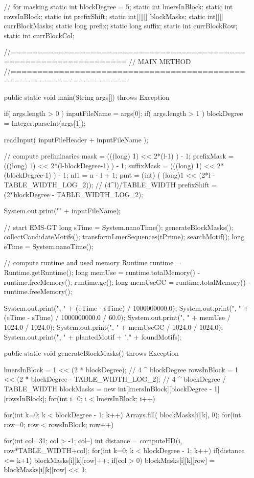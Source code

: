\documentclass[oneside,12pt]{DISCSthesis}
\begin{document}
{\begin{footnotesize}
\begin{verbatimtab}[2]
{	// for masking
	static int blockDegree = 5;
	static int lmersInBlock;
	static int rowsInBlock;
	static int prefixShift;
	static int[][][] blockMasks;
	static int[][] currBlockMasks;
	static long prefix;
	static long suffix;
	static int currBlockRow;
	static int currBlockCol;
	
//===================================================================
// MAIN METHOD
//===================================================================

	public static void main(String args[]) throws Exception {
		if( args.length > 0 ) {
			inputFileName = args[0];
		}
		if( args.length > 1 ) {
			blockDegree = Integer.parseInt(args[1]);
		}

		readInput( inputFileHeader + inputFileName );

		// compute preliminaries
		mask = (((long) 1) << 2*(l-1) ) - 1;
		prefixMask = (((long) 1) << 2*(l-blockDegree-1) ) - 1;
		suffixMask = (((long) 1) << 2*(blockDegree-1) ) - 1;
		nl1 = n - l + 1;
		pmt = (int) ( (long)1 << (2*l - TABLE_WIDTH_LOG_2)); // (4^l)/TABLE_WIDTH
		prefixShift = (2*blockDegree - TABLE_WIDTH_LOG_2);
		
		System.out.print("\n" + inputFileName);
		
		// start EMS-GT
		long sTime = System.nanoTime();
		generateBlockMasks();
		collectCandidateMotifs();
		transformLmerSequences(tPrime);
		searchMotif();		
		long eTime = System.nanoTime();

		// compute runtime and used memory
		Runtime runtime = Runtime.getRuntime();
		long memUse = runtime.totalMemory() - runtime.freeMemory();
		runtime.gc();
		long memUseGC = runtime.totalMemory() - runtime.freeMemory();

		System.out.print(", " + (eTime - sTime) / 1000000000.0);
		System.out.print(", " + (eTime - sTime) / 1000000000.0 / 60.0);
		System.out.print(", " + memUse / 1024.0 / 1024.0);
		System.out.print(", " + memUseGC / 1024.0 / 1024.0);
		System.out.print(", " + plantedMotif + "," + foundMotifs);
	}

	public static void generateBlockMasks() throws Exception {
		lmersInBlock = 1 << (2 * blockDegree);	// 4 ^ blockDegree
		rowsInBlock  = 1 << (2 * blockDegree - TABLE_WIDTH_LOG_2);	
																						// 4 ^ blockDegree / TABLE_WIDTH
		blockMasks = new int[lmersInBlock][blockDegree - 1][rowsInBlock];
		for(int i=0; i < lmersInBlock; i++) {
			for(int k=0; k < blockDegree - 1; k++) {
				Arrays.fill( blockMasks[i][k], 0);
			}
			for(int row=0; row < rowsInBlock; row++) {
				for(int col=31; col > -1; col--) {
					int distance = computeHD(i, row*TABLE_WIDTH+col);
					for(int k=0; k < blockDegree - 1; k++) {
						if(distance <= k+1) {
							blockMasks[i][k][row]++;
						}
						if(col > 0) {
							blockMasks[i][k][row] = blockMasks[i][k][row] << 1;
						}
					}
				}

}}}}
\end{verbatimtab}
\end{footnotesize}}
\end{document}
